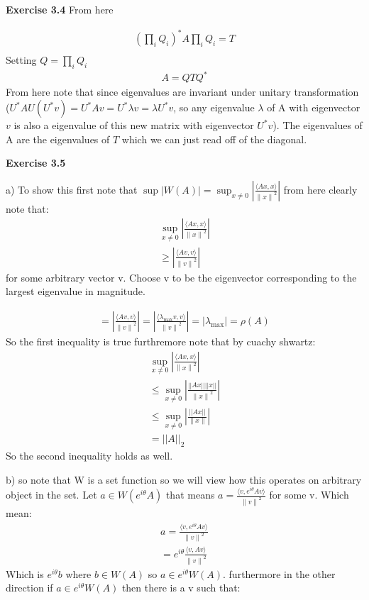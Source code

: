 \documentclass[12pt]{article}
\newenvironment{exercise}[1]{\vspace{.1in}\noindent\textbf{Exercise #1 \hspace{.05em}}}{}
\newcommand{\norm}[1]{\left\lVert#1\right\rVert}
\theoremstyle{definition}
\theoremstyle{remark}
\begin{document}
\begin{exercise}{3.4}
	From here

	\begin{align}
		(\prod_i Q_i)^*A\prod_iQ_i=T \\
	\end{align}
	Setting $Q=\prod_i Q_i$
	\begin{align}
		A=QT Q^*
	\end{align}
	From here note that since eigenvalues are invariant under unitary transformation ($U^*AU(U^*v)=U^*Av=U^*\lambda v=\lambda U^*v$, so any eigenvalue $\lambda$ of A with eigenvector $v$ is also a eigenvalue of this new matrix with eigenvector $U^*v$). The eigenvalues of A are the eigenvalues of $T$ which we can just read off of the diagonal.
\end{exercise}

\begin{exercise}{3.5}

	a) To show this first note that $\sup |W(A)|=\sup_{x\neq 0}|\frac{\langle Ax,x\rangle}{\norm{x}^2}|$ from here clearly note that:
	\begin{align}
		\sup_{x\neq 0}|\frac{\langle Ax,x\rangle}{\norm{x}^2}| \\
		\geq |\frac{\langle Av,v\rangle}{\norm{v}^2}|
	\end{align}
	for some arbitrary vector v. Choose v to be the eigenvector corresponding to the largest eigenvalue in magnitude.

	\begin{align}
		=| \frac{\langle Av,v\rangle}{\norm{v}^2}|
		=| \frac{\langle \lambda_{\text{max}} v,v\rangle}{\norm{v}^2}|
		=| \lambda_{\text{max}}|=\rho(A)
	\end{align}
	So the first inequality is true furthremore note that by cuachy shwartz:
	\begin{align}
		\sup_{x\neq 0}|\frac{\langle Ax,x\rangle}{\norm{x}^2}| \\
		\leq 		\sup_{x\neq 0}|\frac{||Ax||||x||}{\norm{x}^2}|  \\
		\leq 		\sup_{x\neq 0}|\frac{||Ax||}{\norm{x}}|         \\
		=||A||_2
	\end{align}
	So the second inequality holds as well.

	b) so note that W is a set function so we will view how this operates on arbitrary object in the set. Let $a\in W(e^{i \theta}A)$ that means $a=\frac{\langle v, e^{i\theta}Av\rangle}{\norm{v}^2}$ for some v. Which mean:
	\begin{align}
		a=\frac{\langle v, e^{i\theta}Av\rangle}{\norm{v}^2} \\
		=e^{i\theta}\frac{\langle v, Av\rangle}{\norm{v}^2}
	\end{align}
	Which is $e^{i\theta}b$ where $b\in W(A)$ so $a\in e^{i\theta}W(A)$. furthermore in the other direction if $a\in e^{i\theta}W(A)$ then there is a v such that:


\end{exercise}
\end{document}
